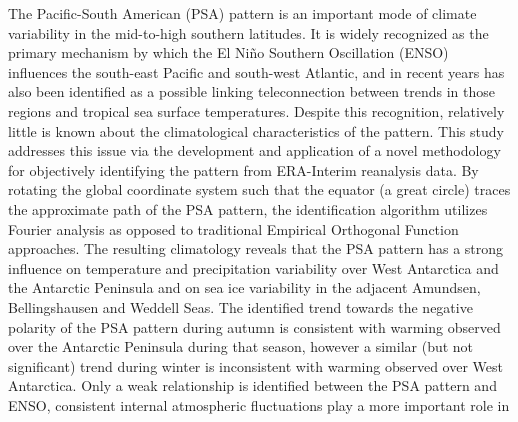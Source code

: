 The Pacific-South American (PSA) pattern is an important mode of climate variability in the mid-to-high southern latitudes. It is widely recognized as the primary mechanism by which the El Ni\~{n}o Southern Oscillation (ENSO) influences the south-east Pacific and south-west Atlantic, and in recent years has also been identified as a possible linking teleconnection between trends in those regions and tropical sea surface temperatures. Despite this recognition, relatively little is known about the climatological characteristics of the pattern. This study addresses this issue via the development and application of a novel methodology for objectively identifying the pattern from ERA-Interim reanalysis data. By rotating the global coordinate system such that the equator (a great circle) traces the approximate path of the PSA pattern, the identification algorithm utilizes Fourier analysis as opposed to traditional Empirical Orthogonal Function approaches. The resulting climatology reveals that the PSA pattern has a strong influence on temperature and precipitation variability over West Antarctica and the Antarctic Peninsula and on sea ice variability in the adjacent Amundsen, Bellingshausen and Weddell Seas. The identified trend towards the negative polarity of the PSA pattern during autumn is consistent with warming observed over the Antarctic Peninsula during that season, however a similar (but not significant) trend during winter is inconsistent with warming observed over West Antarctica. Only a weak relationship is identified between the PSA pattern and ENSO, consistent internal atmospheric fluctuations play a more important role in 